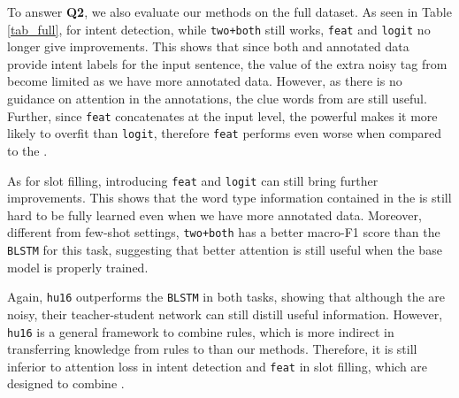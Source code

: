 To answer \textbf{Q2}, we also evaluate our methods on the full dataset. As seen in Table \ref{tab_full}, for intent detection, while
\texttt{two+both} still works, \texttt{feat} and \texttt{logit} no longer give improvements.
This shows that since both \REtag and annotated data provide intent labels for the input sentence, the value of the extra noisy tag from \RE become limited as we have more annotated data.
However, as there is no guidance on attention in the annotations, the clue words from \REs are still useful. Further, since \texttt{feat}
concatenates \REtags at the input level, the powerful \NN makes it more likely to overfit than \texttt{logit}, therefore \texttt{feat}
performs even worse when compared to the \BLSTM.

As for slot filling, introducing \texttt{feat} and \texttt{logit} can still bring further improvements. This shows that the word type information contained in the
\REtags is still hard to be fully learned even when we have more annotated data.
Moreover, different from few-shot settings, \texttt{two+both} has a better macro-F1 score than the \texttt{BLSTM} for this task, suggesting
that better attention is still useful when the base model is properly trained.

Again, \texttt{hu16} outperforms the \texttt{BLSTM} in both tasks, showing that although the \REtags are noisy, their teacher-student
network can still distill useful information. However, \texttt{hu16} is a general framework to combine \FOL rules, which is more indirect
in transferring knowledge from rules to \NN than our methods. Therefore, it is still  inferior to attention loss in intent detection and
\texttt{feat} in slot filling, which are designed to combine \REs.

